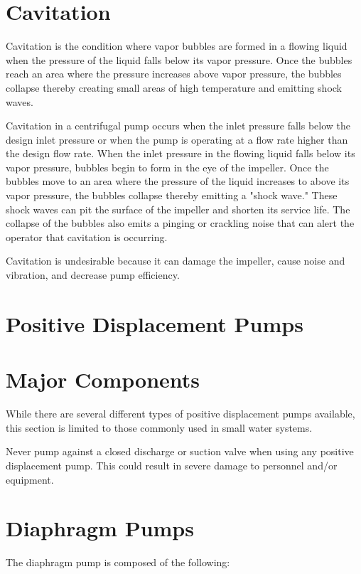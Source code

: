 \documentclass[10pt]{article}
\begin{document}
\section{Cavitation}
Cavitation is the condition where vapor bubbles are formed in a flowing liquid when the pressure of the liquid falls below its vapor pressure. Once the bubbles reach an area where the pressure increases above vapor pressure, the bubbles collapse thereby creating small areas of high temperature and emitting shock waves.

Cavitation in a centrifugal pump occurs when the inlet pressure falls below the design inlet pressure or when the pump is operating at a flow rate higher than the design flow rate. When the inlet pressure in the flowing liquid falls below its vapor pressure, bubbles begin to form in the eye of the impeller. Once the bubbles move to an area where the pressure of the liquid increases to above its vapor pressure, the bubbles collapse thereby emitting a "shock wave." These shock waves can pit the surface of the impeller and shorten its service life. The collapse of the bubbles also emits a pinging or crackling noise that can alert the operator that cavitation is occurring.

Cavitation is undesirable because it can damage the impeller, cause noise and vibration, and decrease pump efficiency.

\section{Positive Displacement Pumps}
\section{Major Components}
While there are several different types of positive displacement pumps available, this section is limited to those commonly used in small water systems.

Never pump against a closed discharge or suction valve when using any positive displacement pump. This could result in severe damage to personnel and/or equipment.

\section{Diaphragm Pumps}
The diaphragm pump is composed of the following:
\end{document}
